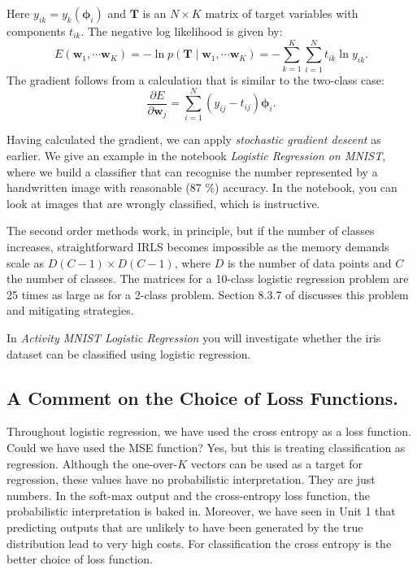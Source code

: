 Here $y_{ik} = y_k(\boldsymbol{\phi}_i)$ and $\boldsymbol{T}$ is an $N \times K$ matrix of target variables with components $t_{ik}$.
The negative log likelihood is given by:
$$
E(\boldsymbol{w}_1, \cdots \boldsymbol{w}_K) = - \ln p(\boldsymbol{T} \mid \boldsymbol{w}_1, \cdots \boldsymbol{w}_K) = -\sum^K_{k=1}\sum^N_{i=1} t_{ik} \ln y_{ik}.
$$
The gradient follows from a calculation that is similar to the two-class case:
$$
\frac{\partial E}{\partial \boldsymbol{w}_j} = \sum^N_{i=1}( y_{ij} - t_{ij}) \boldsymbol{\phi}_i.
$$




Having calculated the gradient, we can apply \emph{stochastic gradient descent} as earlier. We give an example in the notebook \emph{Logistic Regression on MNIST},
where we build a classifier that can recognise the number represented by a handwritten image with reasonable (87 \%) accuracy. In the notebook,
you can look at images that are wrongly classified, which is instructive.


The second order methods work, in principle, but if the number
of classes increases, straightforward IRLS becomes impossible as the memory demands scale as $D(C-1) \times D(C-1)$, where $D$ is the number of data points and
$C$ the number of classes. The matrices for a 10-class logistic regression problem are 25 times as large as for a 2-class problem. Section 8.3.7 of \cite{murphy2012}
discusses this problem and mitigating strategies.


In \emph{Activity MNIST Logistic Regression} you will investigate whether the iris dataset can be classified using logistic regression.

\subsection{A Comment on the Choice of Loss Functions.}
Throughout logistic regression, we have used the cross entropy as a loss function. Could we have used the MSE function? Yes, but this is treating classification
as regression. Although the one-over-$K$ vectors can be used as a target for regression, these values have no probabilistic interpretation. They are just numbers.
In the soft-max output and the cross-entropy loss function, the probabilistic interpretation is baked in. Moreover, we have seen in Unit 1 that predicting
outputs that are unlikely to have been generated by the true distribution lead to very high costs. For classification the cross entropy is the better choice of
loss function.



